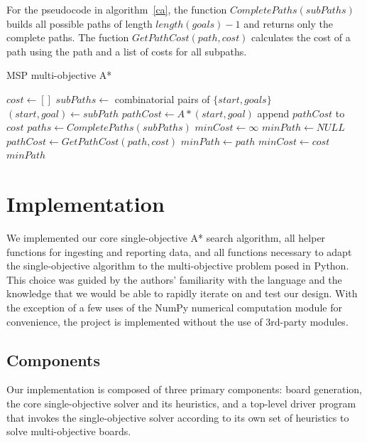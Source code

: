 \documentclass[12pt, conference, compsocconf]{IEEEtran}
\begin{document}
For the pseudocode in algorithm~\ref{ca}, the function
$CompletePaths(subPaths)$ builds all possible paths of length $length(goals)-1$
and returns only the complete paths.  The fuction $GetPathCost(path, cost)$
calculates the cost of a path using the path and a list of costs for all
subpaths.

\begin{algorithm}
    \caption{MSP multi-objective A*}
    \label{ca}
    \begin{algorithmic}[1]
        \State $cost \gets []$
        \State $subPaths\gets$ combinatorial pairs of $\{start, goals\}$
            \State $(start, goal) \gets subPath$
            \State $pathCost \gets A*(start, goal)$
            \State append $pathCost$ to $cost$
        \EndFor
        \State $paths\gets CompletePaths(subPaths)$
        \State $minCost \gets \infty$
        \State $minPath \gets NULL$
            \State $pathCost \gets GetPathCost(path, cost)$
                \State $minPath\gets path$
                \State $minCost\gets cost$
            \EndIf
        \EndFor
        \Return $minPath$
        \EndProcedure
    \end{algorithmic}
\end{algorithm}

\section{Implementation}
We implemented our core single-objective A* search algorithm, all helper
functions for ingesting and reporting data, and all functions necessary to
adapt the single-objective algorithm to the multi-objective problem posed in
Python.  This choice was guided by the authors' familiarity with the language
and the knowledge that we would be able to rapidly iterate on and test our
design.  With the exception of a few uses of the NumPy numerical computation
module for convenience, the project is implemented without the use of 3rd-party
modules.

\subsection{Components}
Our implementation is composed of three primary components: board generation,
the core single-objective solver and its heuristics, and a top-level driver
program that invokes the single-objective solver according to its own set of
heuristics to solve multi-objective boards.
\end{document}
